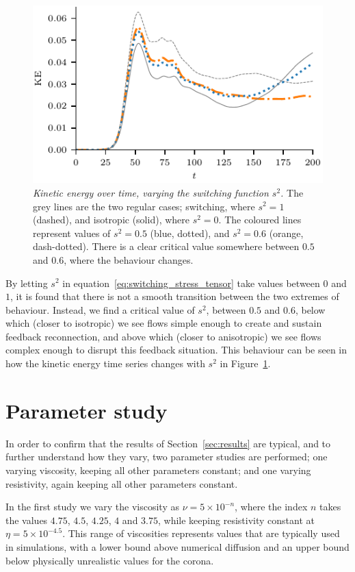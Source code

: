 \begin{figure}[t]
  \centering
  \includegraphics[width=0.5\linewidth]{kinetic-energy-changing-s.pdf}
  \caption{\textit{Kinetic energy over time, varying the switching
        function $s^2$.} The grey lines are the two regular cases; switching, where $s^2 = 1$ (dashed), and isotropic (solid), where $s^2=0$. The coloured lines represent values of $s^2 = 0.5$ (blue, dotted), and $s^2 = 0.6$ (orange, dash-dotted). There is a clear critical value somewhere between $0.5$ and $0.6$, where the behaviour changes.}
  \label{fig:kinetic-energy-changing-s}
\end{figure}

By letting $s^2$ in equation~\eqref{eq:switching_stress_tensor} take values between $0$ and $1$, it is found that there is not a smooth transition between the two extremes of behaviour. Instead, we find a critical value of $s^2$, between $0.5$ and $0.6$, below which (closer to isotropic) we see flows simple enough to create and sustain feedback reconnection, and above which (closer to anisotropic) we see flows complex enough to disrupt this feedback situation. This behaviour can be seen in how the kinetic energy time series changes with $s^2$ in Figure~\ref{fig:kinetic-energy-changing-s}.

\section{Parameter study}
\label{sec:results2}

In order to confirm that the results of Section~\ref{sec:results} are typical, and to further understand how they vary, two parameter studies are performed; one varying viscosity, keeping all other parameters constant; and one varying resistivity, again keeping all other parameters constant. 

In the first study we vary the viscosity as $\nu = 5 \times 10^{-n}$, where the index $n$ takes the values $4.75$, $4.5$, $4.25$, $4$ and $3.75$, while keeping resistivity constant at $\eta = 5\times10^{-4.5}$. This range of viscosities represents values that are typically used in simulations, with a lower bound above numerical diffusion and an upper bound below physically unrealistic values for the corona.

